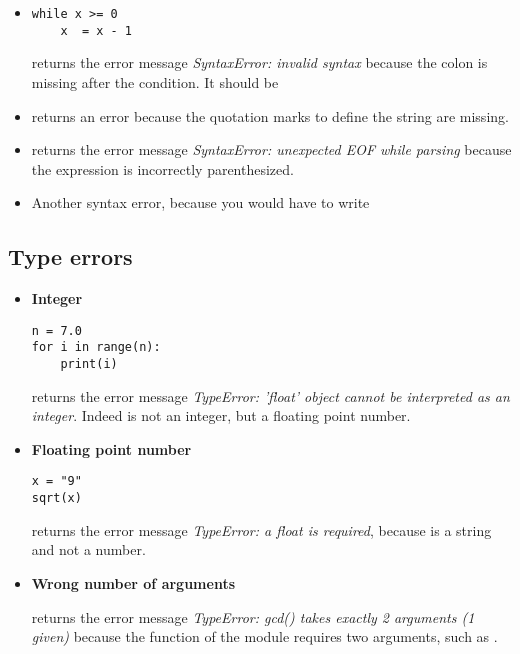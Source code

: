 \documentclass[11pt,class=report,crop=false]{standalone}
\begin{document}
\begin{itemize}
   \item 
\begin{lstlisting}
while x >= 0
    x  = x - 1
\end{lstlisting}

\Python{} returns the error message \emph{SyntaxError: invalid syntax} because the colon is missing after the condition. It should be 

  \item {} returns an error because the quotation marks to define the string are missing. 
  

  \item {} \quad \Python{} returns the error message \emph{SyntaxError: unexpected EOF while parsing} because the expression is incorrectly parenthesized.

  \item {} \quad Another syntax error, because you would have to write 
\end{itemize}



\subsection{Type errors}

\begin{itemize}
   \item \textbf{Integer}
\begin{lstlisting}
n = 7.0
for i in range(n):
    print(i)
\end{lstlisting}

\Python{} returns the error message \emph{TypeError: 'float' object cannot be interpreted as an integer}. Indeed  is not an integer, but a floating point number. 

  \item \textbf{Floating point number}
\begin{lstlisting}
x = "9"
sqrt(x)
\end{lstlisting} 
  \Python{} returns the error message \emph{TypeError: a float is required}, because  is a string and not a number.
  
  \item \textbf{Wrong number of arguments}
  
   \quad \Python{} returns the error message \emph{TypeError: gcd() takes exactly 2 arguments (1 given)}
  because the  function of the  module requires two arguments, such as .
 
 \end{itemize}
\end{document}
